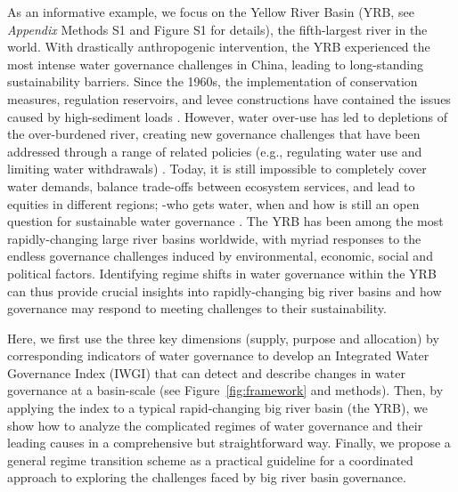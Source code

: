 As an informative example, we focus on the Yellow River Basin (YRB, see \textit{Appendix} Methods S1 and Figure S1 for details), the fifth-largest river in the world.
With drastically anthropogenic intervention, the YRB experienced the most intense water governance challenges in China, leading to long-standing sustainability barriers.
Since the 1960s, the implementation of conservation measures, regulation reservoirs, and levee constructions have contained the issues caused by high-sediment loads
\cite{wangReducedsedimenttransport2016,wuEvolutioneffectssocialecological2020}.
However, water over-use has led to depletions of the over-burdened river, creating new governance challenges that have been addressed through a range of related policies (e.g., regulating water use and limiting water withdrawals)
\cite{xiaDevelopmentWaterAllocation2012}.
Today, it is still impossible to completely cover water demands, balance trade-offs between ecosystem services, and lead to equities in different regions; -who gets water, when and how is still an open question for sustainable water governance
\cite{wangYellowRiverwater2019,wohlfartSocialecologicalchallengesYellow2016}.
The YRB has been among the most rapidly-changing large river basins worldwide, with myriad responses to the endless governance challenges induced by environmental, economic, social and political factors. Identifying regime shifts in water governance within the YRB can thus provide crucial insights into rapidly-changing big river basins and how governance may respond to meeting challenges to their sustainability.

Here, we first use the three key dimensions (supply, purpose and allocation) by corresponding indicators of water governance to develop an Integrated Water Governance Index (IWGI) that can detect and describe changes in water governance at a basin-scale (see Figure~\ref{fig:framework} and methods).
Then, by applying the index to a typical rapid-changing big river basin (the YRB), we show how to analyze the complicated regimes of water governance and their leading causes in a comprehensive but straightforward way.
Finally, we propose a general regime transition scheme as a practical guideline for a coordinated approach to exploring the challenges faced by big river basin governance.

